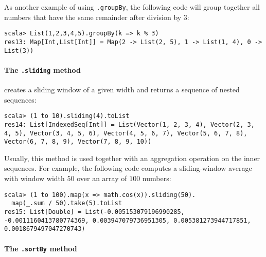 As another example of using \lstinline!.groupBy!,
the following code will group together all numbers that have the same
remainder after division by $3$:
\begin{lstlisting}
scala> List(1,2,3,4,5).groupBy(k => k % 3)
res13: Map[Int,List[Int]] = Map(2 -> List(2, 5), 1 -> List(1, 4), 0 -> List(3))
\end{lstlisting}

\paragraph*{The \lstinline!.sliding!
method}

creates a sliding window of a given width and returns a sequence of
nested sequences:
\begin{lstlisting}
scala> (1 to 10).sliding(4).toList
res14: List[IndexedSeq[Int]] = List(Vector(1, 2, 3, 4), Vector(2, 3, 4, 5), Vector(3, 4, 5, 6), Vector(4, 5, 6, 7), Vector(5, 6, 7, 8), Vector(6, 7, 8, 9), Vector(7, 8, 9, 10))
\end{lstlisting}
Usually, this method is used together with an aggregation operation
on the inner sequences. For example, the following code computes a
sliding-window average with window width $50$ over an array of $100$
numbers:
\begin{lstlisting}
scala> (1 to 100).map(x => math.cos(x)).sliding(50).
  map(_.sum / 50).take(5).toList
res15: List[Double] = List(-0.005153079196990285, -0.0011160413780774369, 0.003947079736951305, 0.005381273944717851, 0.0018679497047270743)
\end{lstlisting}

\paragraph*{The \lstinline!.sortBy!
method}

